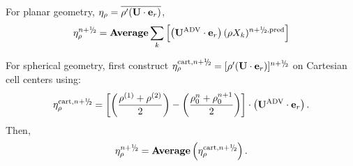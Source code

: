\begin{description}
\item For planar geometry, $\eta_\rho = \overline{\rho'({\bf{U}}\cdot{\bf{e}}_r)}$,
\begin{equation}
 \etarho^{\nph} =  {\rm {\bf Average}} \sum_k \left[ \left(\uadvtwo \cdot \eb_r \right) (\rho X_k)^{\nph,\pred} \right]
\end{equation}
\item For spherical geometry, first construct 
$\etarho^{{\rm cart},\nph} = [\rho'(\Ub\cdot\eb_r)]^{\nph}$ on Cartesian cell centers using:
\begin{equation}
\etarho^{{\rm cart},\nph} = \left[\left(\frac{\rho^{(1)}+\rho^{(2)}}{2}\right)-\left(\frac{\rho_0^n+\rho_0^{n+1}}{2}\right)\right] \cdot \left( \uadvtwo \cdot \eb_r \right).
\end{equation}
Then,
\begin{equation}
\etarho^{\nph} = {\rm {\bf Average}}\left(\etarho^{{\rm cart},\nph}\right).
\end{equation}
\end{description}



